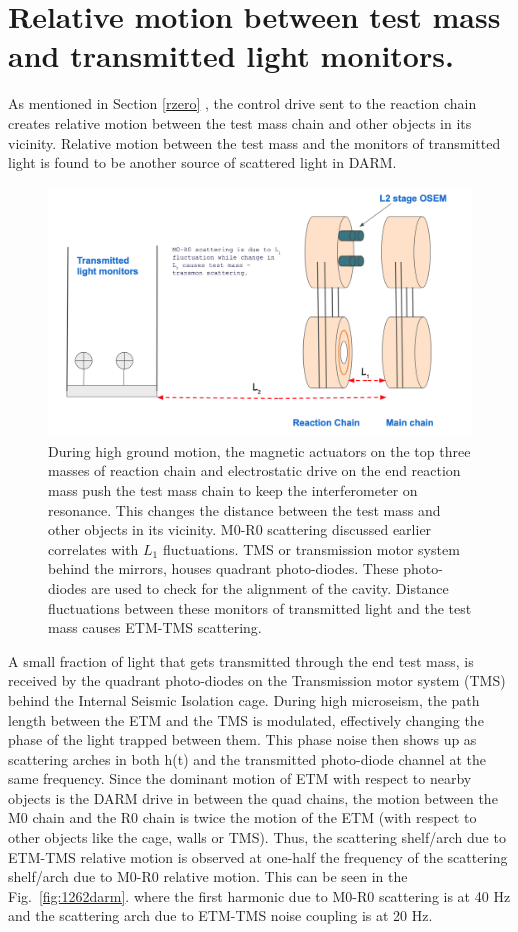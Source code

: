 \documentclass[12pt]{iopart}
\begin{document}
\section{Relative motion between test mass and transmitted light monitors.} \label{transmon_scattering}
As mentioned in Section \ref{rzero} , the control drive sent to the reaction chain creates relative motion between the test mass chain and other objects in its vicinity. Relative motion between the test mass and the monitors of transmitted light is found to be another source of scattered light in DARM.
\par
\begin{figure}[h]
    \centering
    \includegraphics[width=12cm]{mirror-diag2.png}
    \caption{During high ground motion, the magnetic actuators on the top three masses of reaction chain and electrostatic drive on the end reaction mass push the test mass chain to keep the interferometer on resonance. This changes the distance between the test mass and other objects in its vicinity. M0-R0 scattering discussed earlier correlates with $L_{1}$ fluctuations. TMS or transmission motor system behind the mirrors, houses quadrant photo-diodes. These photo-diodes are used to check for the alignment of the cavity. Distance fluctuations between these monitors of  transmitted light and the test mass causes ETM-TMS scattering.}
    \label{fig:my_label}
\end{figure}

A small fraction of light that gets transmitted through the end test mass, is received by the quadrant photo-diodes on the Transmission motor system (TMS) behind the Internal Seismic Isolation cage. During high microseism, the path length between the ETM and the TMS is modulated, effectively changing the phase of the light trapped between them. This phase noise then shows up as scattering arches in both h(t) and the transmitted photo-diode channel at the same frequency. 
Since the dominant motion of ETM with respect to nearby objects is the DARM drive in between the quad chains, the motion between the M0 chain and the R0 chain is twice the motion of the ETM (with respect to other objects like the cage, walls or TMS). Thus, the scattering shelf/arch due to ETM-TMS relative motion is observed at one-half the frequency of the scattering shelf/arch due to M0-R0 relative motion. This can be seen in the Fig.~\ref{fig:1262darm}. where the first harmonic due to M0-R0 scattering is at 40 Hz and the scattering arch due to ETM-TMS noise coupling is at 20 Hz.
\end{document}
